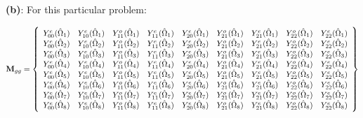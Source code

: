 \documentclass[10pt]{article}
\begin{document}
\textbf{(b)}: For this particular problem:

\begin{equation}
\textbf{M}_{gg}=\left\{
\begin{array}{*{13}c}
Y_{00}^e(\hat{\Omega}_1)  & Y_{10}^e(\hat{\Omega}_1) & Y_{11}^o(\hat{\Omega}_1) & Y_{11}^e(\hat{\Omega}_1) & Y_{20}^e(\hat{\Omega}_1) & Y_{21}^o(\hat{\Omega}_1) & Y_{21}^e(\hat{\Omega}_1) & Y_{22}^o(\hat{\Omega}_1) & Y_{22}^e(\hat{\Omega}_1)\\
Y_{00}^e(\hat{\Omega}_2)  & Y_{10}^e(\hat{\Omega}_2) & Y_{11}^o(\hat{\Omega}_2) & Y_{11}^e(\hat{\Omega}_2) & Y_{20}^e(\hat{\Omega}_2) & Y_{21}^o(\hat{\Omega}_2) & Y_{21}^e(\hat{\Omega}_2) & Y_{22}^o(\hat{\Omega}_2) & Y_{22}^e(\hat{\Omega}_2)\\
Y_{00}^e(\hat{\Omega}_3)  & Y_{10}^e(\hat{\Omega}_3) & Y_{11}^o(\hat{\Omega}_3) & Y_{11}^e(\hat{\Omega}_3) & Y_{20}^e(\hat{\Omega}_3) & Y_{21}^o(\hat{\Omega}_3) & Y_{21}^e(\hat{\Omega}_3) & Y_{22}^o(\hat{\Omega}_3) & Y_{22}^e(\hat{\Omega}_3)\\
Y_{00}^e(\hat{\Omega}_4)  & Y_{10}^e(\hat{\Omega}_4) & Y_{11}^o(\hat{\Omega}_4) & Y_{11}^e(\hat{\Omega}_4) & Y_{20}^e(\hat{\Omega}_4) & Y_{21}^o(\hat{\Omega}_4) & Y_{21}^e(\hat{\Omega}_4) & Y_{22}^o(\hat{\Omega}_4) & Y_{22}^e(\hat{\Omega}_4)\\
Y_{00}^e(\hat{\Omega}_5)  & Y_{10}^e(\hat{\Omega}_5) & Y_{11}^o(\hat{\Omega}_5) & Y_{11}^e(\hat{\Omega}_5) & Y_{20}^e(\hat{\Omega}_5) & Y_{21}^o(\hat{\Omega}_5) & Y_{21}^e(\hat{\Omega}_5) & Y_{22}^o(\hat{\Omega}_5) & Y_{22}^e(\hat{\Omega}_5)\\
Y_{00}^e(\hat{\Omega}_6)  & Y_{10}^e(\hat{\Omega}_6) & Y_{11}^o(\hat{\Omega}_6) & Y_{11}^e(\hat{\Omega}_6) & Y_{20}^e(\hat{\Omega}_6) & Y_{21}^o(\hat{\Omega}_6) & Y_{21}^e(\hat{\Omega}_6) & Y_{22}^o(\hat{\Omega}_6) & Y_{22}^e(\hat{\Omega}_6)\\
Y_{00}^e(\hat{\Omega}_7)  & Y_{10}^e(\hat{\Omega}_7) & Y_{11}^o(\hat{\Omega}_7) & Y_{11}^e(\hat{\Omega}_7) & Y_{20}^e(\hat{\Omega}_7) & Y_{21}^o(\hat{\Omega}_7) & Y_{21}^e(\hat{\Omega}_7) & Y_{22}^o(\hat{\Omega}_7) & Y_{22}^e(\hat{\Omega}_7)\\
Y_{00}^e(\hat{\Omega}_8)  & Y_{10}^e(\hat{\Omega}_8) & Y_{11}^o(\hat{\Omega}_8) & Y_{11}^e(\hat{\Omega}_8) & Y_{20}^e(\hat{\Omega}_8) & Y_{21}^o(\hat{\Omega}_8) & Y_{21}^e(\hat{\Omega}_8) & Y_{22}^o(\hat{\Omega}_8) & Y_{22}^e(\hat{\Omega}_8)\\
\end{array}\right\}
\end{equation}
\end{document}
